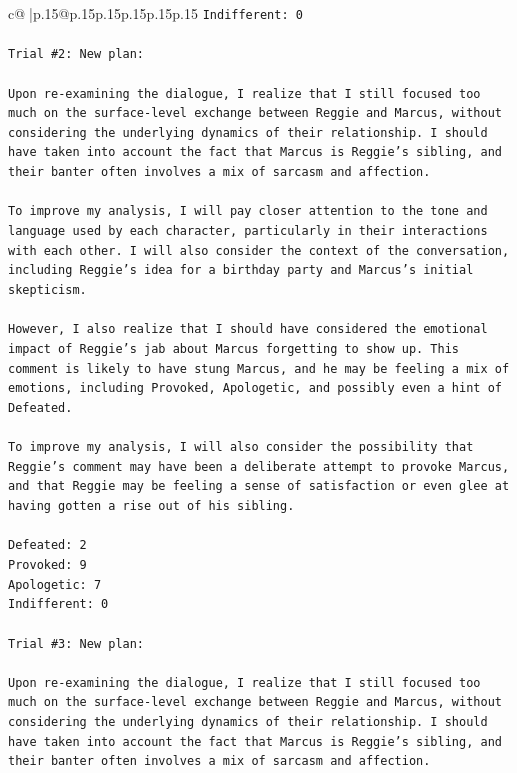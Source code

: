 \documentclass{article}
\begin{document}
{\begin{supertabular}{c@{$\;$}|p{.15\linewidth}@{}p{.15\linewidth}p{.15\linewidth}p{.15\linewidth}p{.15\linewidth}p{.15\linewidth}}
{{{\texttt{Indifferent: 0} \\
\\ 
\texttt{Trial \#2: New plan: } \\
\\ 
\texttt{Upon re{-}examining the dialogue, I realize that I still focused too much on the surface{-}level exchange between Reggie and Marcus, without considering the underlying dynamics of their relationship. I should have taken into account the fact that Marcus is Reggie's sibling, and their banter often involves a mix of sarcasm and affection.} \\
\\ 
\texttt{To improve my analysis, I will pay closer attention to the tone and language used by each character, particularly in their interactions with each other. I will also consider the context of the conversation, including Reggie's idea for a birthday party and Marcus's initial skepticism.} \\
\\ 
\texttt{However, I also realize that I should have considered the emotional impact of Reggie's jab about Marcus forgetting to show up. This comment is likely to have stung Marcus, and he may be feeling a mix of emotions, including Provoked, Apologetic, and possibly even a hint of Defeated.} \\
\\ 
\texttt{To improve my analysis, I will also consider the possibility that Reggie's comment may have been a deliberate attempt to provoke Marcus, and that Reggie may be feeling a sense of satisfaction or even glee at having gotten a rise out of his sibling.} \\
\\ 
\texttt{Defeated: 2} \\
\texttt{Provoked: 9} \\
\texttt{Apologetic: 7} \\
\texttt{Indifferent: 0} \\
\\ 
\texttt{Trial \#3: New plan: } \\
\\ 
\texttt{Upon re{-}examining the dialogue, I realize that I still focused too much on the surface{-}level exchange between Reggie and Marcus, without considering the underlying dynamics of their relationship. I should have taken into account the fact that Marcus is Reggie's sibling, and their banter often involves a mix of sarcasm and affection.} \\
\\ 
}}}
\end{supertabular}}
\end{document}
